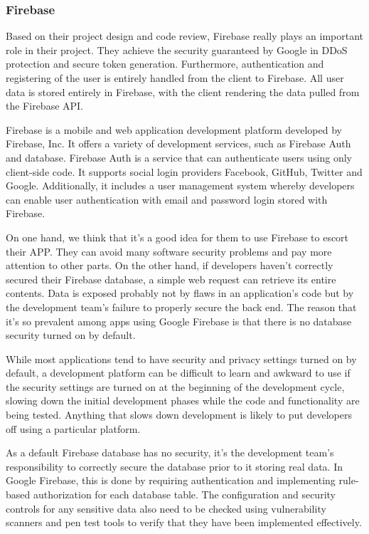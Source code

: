 \documentclass[12pt, a4paper]{article}
\begin{document}
\subsubsection{Firebase}
Based on their project design and code review, Firebase really plays an important role in their project. They achieve the security guaranteed by Google in DDoS protection and secure token generation. Furthermore, authentication and registering of the user is entirely handled from the client to Firebase. All user data is stored entirely in Firebase, with the client rendering the data pulled from the Firebase API. 

Firebase is a mobile and web application development platform developed by Firebase, Inc. It offers a variety of development services, such as Firebase Auth and database. Firebase Auth is a service that can authenticate users using only client-side code. It supports social login providers Facebook, GitHub, Twitter and Google. Additionally, it includes a user management system whereby developers can enable user authentication with email and password login stored with Firebase.

On one hand, we think that it's a good idea for them to use Firebase to escort their APP. They can avoid many software security problems and pay more attention to other parts. On the other hand, if developers haven't correctly secured their Firebase database, a simple web request can retrieve its entire contents. Data is exposed probably not by flaws in an application's code but by the development team's failure to properly secure the back end. The reason that it's so prevalent among apps using Google Firebase is that there is no database security turned on by default.

While most applications tend to have security and privacy settings turned on by default, a development platform can be difficult to learn and awkward to use if the security settings are turned on at the beginning of the development cycle, slowing down the initial development phases while the code and functionality are being tested. Anything that slows down development is likely to put developers off using a particular platform.

As a default Firebase database has no security, it's the development team's responsibility to correctly secure the database prior to it storing real data. In Google Firebase, this is done by requiring authentication and implementing rule-based authorization for each database table. The configuration and security controls for any sensitive data also need to be checked using vulnerability scanners and pen test tools to verify that they have been implemented effectively.
\end{document}
